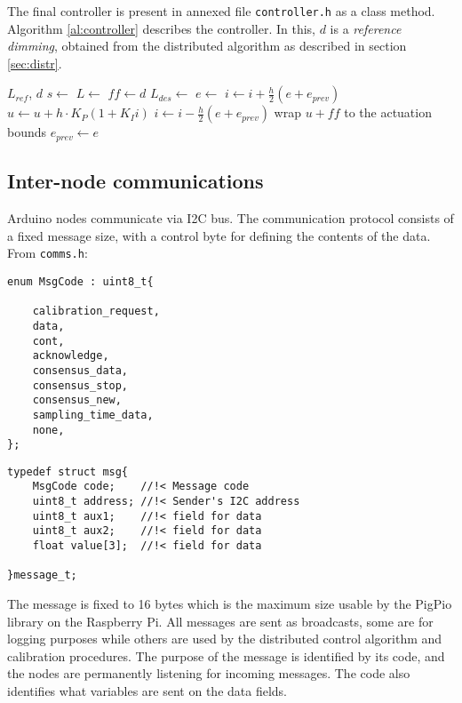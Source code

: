 \documentclass[english,fira]{ist-report}
\begin{document}
The final controller is present in annexed file \texttt{controller.h} as a class method. Algorithm \ref{al:controller} describes the controller. In this, $d$ is a \textit{reference dimming}, obtained from the distributed algorithm as described in section \ref{sec:distr}.

\begin{algorithm}[ht]
  \caption{PI + feed-forward control algorithm, called by an interrupt with period \SI{5}{\milli\second}.}
  \label{al:controller}
  \begin{algorithmic}[1]
    \Require $L_{ref}$, $d$
    \State $s \gets $
	\State $L \gets $
	\State $ff \gets d$
	\State $L_{des} \gets $
	\State $e \gets $
	\State $i \gets i + \frac{h}{2}(e+e_{prev})$
	\State $u \gets u + h \cdot K_P (1+K_I i)$
	\State {}  
	     
	    \State $i \gets i - \frac{h}{2}(e+e_{prev})$
	    \State wrap $u+ff$ to the actuation bounds
	\EndIf
	\State $e_{prev} \gets e$
  \end{algorithmic}
\end{algorithm}

\subsection{Inter-node communications} \label{sec:comms}

Arduino nodes communicate via I2C bus. The communication protocol consists of a fixed message size, with a control byte for defining the contents of the data. From \texttt{comms.h}:
\label{lis:dataformats}
\begin{verbatim}
enum MsgCode : uint8_t{

    calibration_request,
    data,
    cont,
    acknowledge,
    consensus_data,
    consensus_stop,
    consensus_new,
    sampling_time_data,
    none,
};
\end{verbatim}
\begin{verbatim}
typedef struct msg{
    MsgCode code;    //!< Message code
    uint8_t address; //!< Sender's I2C address
    uint8_t aux1;    //!< field for data
    uint8_t aux2;    //!< field for data
    float value[3];  //!< field for data

}message_t;
\end{verbatim}
The message is fixed to 16 bytes which is the maximum size usable by the PigPio library on the Raspberry Pi.
All messages are sent as broadcasts, some are for logging purposes while others are used by the distributed control algorithm and calibration procedures. The purpose of the message is identified by its code, and the nodes are permanently listening for incoming messages. The code also identifies what variables are sent on the data fields.
\end{document}
